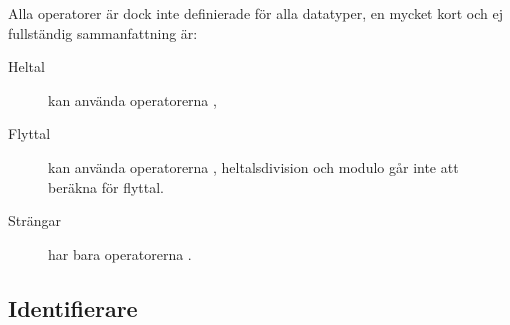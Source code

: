 \documentclass{beamer}
\begin{document}
\begin{frame}{\insertsubsectionhead}
  Alla operatorer är dock inte definierade för alla datatyper, en mycket kort
  och ej fullständig sammanfattning är:

  \begin{description}
    \item[Heltal] kan använda operatorerna \code{+ - * / // \%},
    \item[Flyttal] kan använda operatorerna \code{+ - * /}, heltalsdivision och 
      modulo går inte att beräkna för flyttal.
    \item[Strängar] har bara operatorerna \code{+ *}.
  \end{description}
\end{frame}


%


\subsection{Identifierare}
\end{document}
